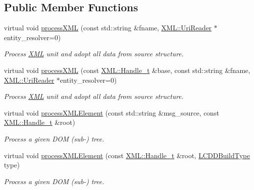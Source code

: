 \subsection*{Public Member Functions}
\begin{DoxyCompactItemize}
\item 
virtual void \hyperlink{class_d_d4hep_1_1_l_c_d_d_load_a7d15299b8ebc6817f3a8c2bf756422b4}{process\+X\+ML} (const std\+::string \&fname, \hyperlink{class_d_d4hep_1_1_x_m_l_1_1_uri_reader}{X\+M\+L\+::\+Uri\+Reader} $\ast$entity\+\_\+resolver=0)
\begin{DoxyCompactList}\small\item\em Process \hyperlink{namespace_d_d4hep_1_1_x_m_l}{X\+ML} unit and adopt all data from source structure. \end{DoxyCompactList}\item 
virtual void \hyperlink{class_d_d4hep_1_1_l_c_d_d_load_aafc1d3cf48aa3e8a7446e66a0ed93e04}{process\+X\+ML} (const \hyperlink{class_d_d4hep_1_1_x_m_l_1_1_handle__t}{X\+M\+L\+::\+Handle\+\_\+t} \&base, const std\+::string \&fname, \hyperlink{class_d_d4hep_1_1_x_m_l_1_1_uri_reader}{X\+M\+L\+::\+Uri\+Reader} $\ast$entity\+\_\+resolver=0)
\begin{DoxyCompactList}\small\item\em Process \hyperlink{namespace_d_d4hep_1_1_x_m_l}{X\+ML} unit and adopt all data from source structure. \end{DoxyCompactList}\item 
virtual void \hyperlink{class_d_d4hep_1_1_l_c_d_d_load_a4f51d1a8f1e4c726371a0553d3478430}{process\+X\+M\+L\+Element} (const std\+::string \&msg\+\_\+source, const \hyperlink{class_d_d4hep_1_1_x_m_l_1_1_handle__t}{X\+M\+L\+::\+Handle\+\_\+t} \&root)
\begin{DoxyCompactList}\small\item\em Process a given D\+OM (sub-\/) tree. \end{DoxyCompactList}\item 
virtual void \hyperlink{class_d_d4hep_1_1_l_c_d_d_load_a6273870262bd0bd4102b546c1ef9d04d}{process\+X\+M\+L\+Element} (const \hyperlink{class_d_d4hep_1_1_x_m_l_1_1_handle__t}{X\+M\+L\+::\+Handle\+\_\+t} \&root, \hyperlink{namespace_d_d4hep_acafe43ba4537ab6e999e808142965fab}{L\+C\+D\+D\+Build\+Type} type)
\begin{DoxyCompactList}\small\item\em Process a given D\+OM (sub-\/) tree. \end{DoxyCompactList}\end{DoxyCompactItemize}

